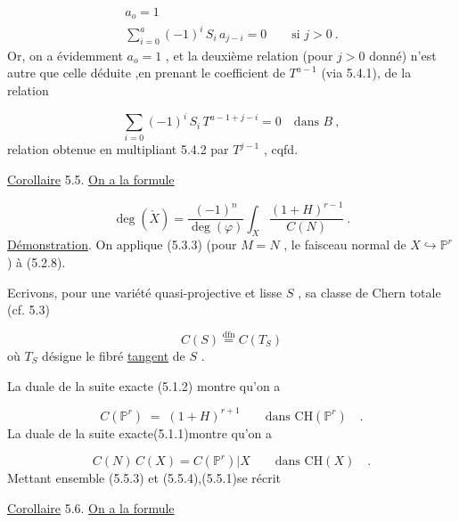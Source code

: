 \begin{equation}\tag{5.4.6}
 \begin{array}{l} a_o = 1 \\[4pt] \sum\limits_{i=0}^{a} (-1)^i \, S_i \, a_{j-i} = 0 \qquad \mbox{si } j > 0 \ . \end{array}
\end{equation}
Or, on a évidemment $a_o = 1$ , et la deuxième relation (pour $j > 0$ donné) n'est autre que celle déduite ,en prenant le coefficient de $T^{a-1}$ (via 5.4.1), de la relation

\begin{equation}\tag{5.4.7}
\sum_{i=0} (-1)^i \, S_i \, T^{a-1+j-i} = 0 \quad \mbox{dans } B \ ,
\end{equation}
relation obtenue en multipliant 5.4.2 par $T^{j-1}$ , cqfd.

\underline{Corollaire} 5.5. \underline{On a la formule}

\begin{equation}\tag{5.5.1}
\deg(\check{X}) = \frac{(-1)^n}{\deg(\varphi)} \int_X \frac{(1+H)^{r-1}}{C(N)} \ .
\end{equation}
\underline{Démonstration}. On applique (5.3.3) (pour $M = N$ , le faisceau normal de $X \hookrightarrow \mathbb{P}^r$) à (5.2.8).

Ecrivons, pour une variété quasi-projective et lisse $S$ , sa classe de Chern totale (cf. 5.3)

\begin{equation}\tag{5.5.2}
C(S) \stackrel{\mathrm{dfn}}{=} C(T_S)
\end{equation}
où $T_S$ désigne le fibré \underline{tangent} de $S$ .



La duale de la suite exacte (5.1.2) montre qu'on a

\begin{equation}\tag{5.5.3}
C(\mathbb{P}^r) \;=\; (1 + H)^{r+1} \qquad \text{dans } \mathrm{CH}(\mathbb{P}^r) \quad .
\end{equation}
La duale de la suite exacte(5.1.1)montre qu'on a

\begin{equation}\tag{5.5.4}
C(N)\, C(X) = C(\mathbb{P}^r)|X \qquad \text{dans } \mathrm{CH}(X) \quad .
\end{equation}
Mettant ensemble (5.5.3) et (5.5.4),(5.5.1)se récrit

\underline{Corollaire} 5.6. \qquad \underline{On a la formule}

